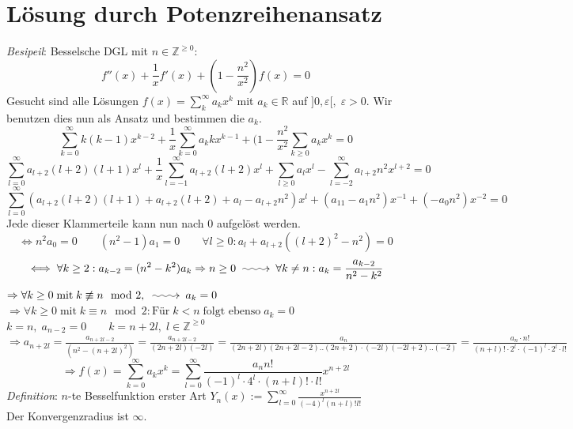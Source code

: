 \documentclass[12pt,a4paper,titlepage]{article}
\makeatletter
\newcommand{\longsquiggly}{\xymatrix{{}\ar@{~>}[r]&{}}}
\makeatother
\begin{document}
\section*{Lösung durch Potenzreihenansatz}
\textit{Besipeil}: Besselsche DGL mit $n\in\mathbb{Z}^{\geq0}$:
$$f''(x)+\frac{1}{x}f'(x)+(1-\frac{n^2}{x^2})f(x)=0$$
Gesucht sind alle Lösungen $f(x)=\sum_k^\infty a_kx^k$ mit $a_k\in\mathbb{R}$ auf $]0,\varepsilon[,\;\varepsilon>0$. Wir benutzen dies nun als Ansatz und bestimmen die $a_k$.
$$\sum\limits_{k=0}^\infty k(k-1)x^{k-2}+\frac{1}{x}\sum\limits_{k=0}^\infty a_kkx^{k-1}+(1-\frac{n^2}{x^2}\sum\limits_{k\geq0} a_kx^k=0$$
$$\sum\limits_{l=0}^\infty a_{l+2}(l+2)(l+1)x^l+\frac{1}{x}\sum\limits_{l=-1}^\infty a_{l+2}(l+2)x^l+\sum\limits_{l\geq0}a_lx^l-\sum\limits_{l=-2}^\infty a_{l+2}n^2x^{l+2}=0$$
$$\sum\limits_{l=0}^\infty(a_{l+2}(l+2)(l+1)+a_{l+2}(l+2)+a_l-a_{l+2}n^2)x^l+(a_11-a_1n^2)x^{-1}+(-a_0n^2)x^{-2}=0$$
Jede dieser Klammerteile kann nun nach $0$ aufgelöst werden.
$$\iff n^2a_0=0 \quad\quad (n^2-1)a_1=0 \quad\quad \forall l\geq0: a_l+a_{l+2}((l+2)^2-n^2)=0$$
$$\iff \forall k\geq2: a_{k-2}=(n^2-k^2)a_k \Rightarrow n\geq0 \longsquiggly \forall k\neq n: a_k=\frac{a_{k-2}}{n^2-k^2}$$
$\Rightarrow \forall k\geq0 \;\text{mit}\; k\not\equiv n\mod2, \longsquiggly a_k=0$\\
$\Rightarrow \forall k\geq0 \;\text{mit}\; k\equiv n\mod2: \text{Für}\; k<n \;\text{folgt ebenso}\; a_k=0$\\
$k=n,\; a_{n-2}=0 \quad\quad k=n+2l,\; l\in\mathbb{Z}^{\geq0}$\\
$\Rightarrow a_{n+2l}=\frac{a_{n+2l-2}}{(n^2-(n+2l)^2)} = \frac{a_{n+2l-2}}{(2n+2l)(-2l)} = \frac{a_n}{(2n+2l)(2n+2l-2)..(2n+2) \cdot (-2l)(-2l+2)..(-2)} = \frac{a_n\cdot n!}{(n+l)!\cdot 2^l\cdot (-1)^l\cdot 2^l\cdot l!}$\\
$$\Rightarrow f(x)=\sum\limits_{k=0}^\infty a_kx^k=\sum\limits_{l=0}^\infty\frac{a_nn!}{(-1)^l\cdot 4^l\cdot (n+l)!\cdot l!}x^{n+2l}$$
\textit{Definition}: $n$-te Besselfunktion erster Art $Y_n(x):=\sum\limits_{l=0}^\infty\frac{x^{n+2l}}{(-4)^l(n+l)!l!}$ \\
Der Konvergenzradius ist $\infty$.
\end{document}
